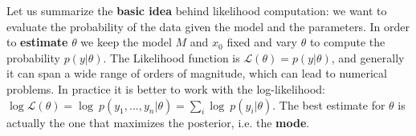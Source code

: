 \documentclass[../main/main.tex]{subfiles}
\begin{document}
Let us summarize the \textbf{basic idea} behind likelihood computation: we want to evaluate the probability of the data given the model and the parameters. In order to \textbf{estimate} $\theta$ we keep the model $M$ and $x_0$ fixed and vary $\theta$ to compute the probability $p(y|\theta)$. The Likelihood function is $\mathcal{L} (\theta) = p(y | \theta)$, and generally it can span a wide range of orders of magnitude, which can lead to numerical problems. In practice it is better to work with the log-likelihood: $\log \mathcal{L}(\theta) = \log\ p(y_1, ..., y_n | \theta) = \sum_i \log\ p (y_i | \theta)$. The best estimate for $\theta$ is actually the one that maximizes the posterior, i.e. the \textbf{mode}.
\end{document}
